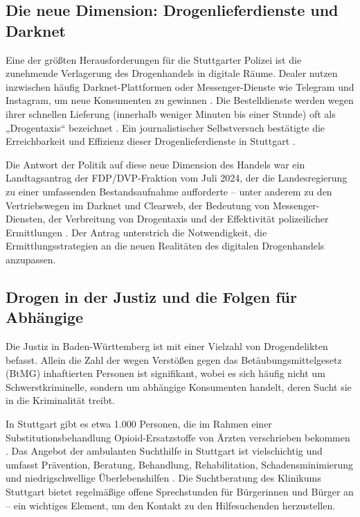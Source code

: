 \documentclass[11pt,a4paper]{article}
\begin{document}
	\subsection{Die neue Dimension: Drogenlieferdienste und Darknet}
	
	Eine der größten Herausforderungen für die Stuttgarter Polizei ist die zunehmende Verlagerung des Drogenhandels in digitale Räume. Dealer nutzen inzwischen häufig Darknet-Plattformen oder Messenger-Dienste wie Telegram und Instagram, um neue Konsumenten zu gewinnen \cite{stuttgart-drug-delikte}. Die Bestelldienste werden wegen ihrer schnellen Lieferung (innerhalb weniger Minuten bis einer Stunde) oft als „Drogentaxis“ bezeichnet \cite{stuttgart-drug-delikte}. Ein journalistischer Selbstversuch bestätigte die Erreichbarkeit und Effizienz dieser Drogenlieferdienste in Stuttgart \cite{stuttgart-drug-delikte}.
	
	Die Antwort der Politik auf diese neue Dimension des Handels war ein Landtagsantrag der FDP/DVP-Fraktion vom Juli 2024, der die Landesregierung zu einer umfassenden Bestandsaufnahme aufforderte – unter anderem zu den Vertriebswegen im Darknet und Clearweb, der Bedeutung von Messenger-Diensten, der Verbreitung von Drogentaxis und der Effektivität polizeilicher Ermittlungen \cite{landtag-antrag}. Der Antrag unterstrich die Notwendigkeit, die Ermittlungsstrategien an die neuen Realitäten des digitalen Drogenhandels anzupassen.
	
	\subsection{Drogen in der Justiz und die Folgen für Abhängige}
	
	Die Justiz in Baden-Württemberg ist mit einer Vielzahl von Drogendelikten befasst. Allein die Zahl der wegen Verstößen gegen das Betäubungsmittelgesetz (BtMG) inhaftierten Personen ist signifikant, wobei es sich häufig nicht um Schwerstkriminelle, sondern um abhängige Konsumenten handelt, deren Sucht sie in die Kriminalität treibt.
	
	In Stuttgart gibt es etwa 1.000 Personen, die im Rahmen einer Substitutionsbehandlung Opioid-Ersatzstoffe von Ärzten verschrieben bekommen \cite{substitution-stuttgart}. Das Angebot der ambulanten Suchthilfe in Stuttgart ist vielschichtig und umfasst Prävention, Beratung, Behandlung, Rehabilitation, Schadensminimierung und niedrigschwellige Überlebenshilfen \cite{suchthilfe-stuttgart}. Die Suchtberatung des Klinikums Stuttgart bietet regelmäßige offene Sprechstunden für Bürgerinnen und Bürger an \cite{suchtberatung-stuttgart} – ein wichtiges Element, um den Kontakt zu den Hilfesuchenden herzustellen.
	
\end{document}
